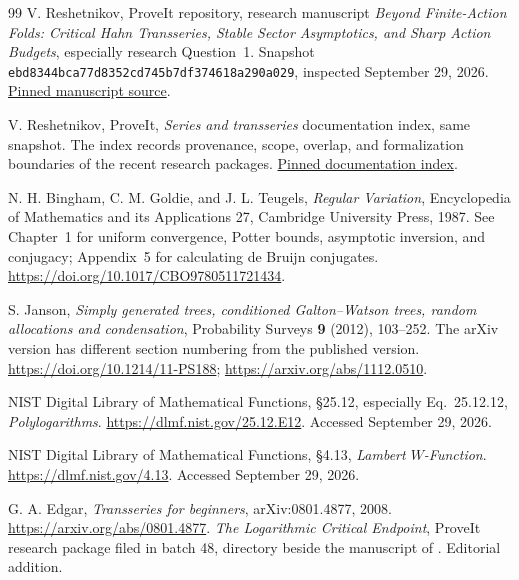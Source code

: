 \documentclass[11pt,a4paper]{article}
\numberwithin{equation}{section}
\theoremstyle{definition}\newtheorem{definition}[theorem]{Definition}
\theoremstyle{remark}\newtheorem{remark}[theorem]{Remark}
\theoremstyle{definition}
\begin{document}
\clearpage
\begin{thebibliography}{99}
V. Reshetnikov, ProveIt repository, research manuscript
\emph{Beyond Finite-Action Folds: Critical Hahn Transseries, Stable Sector
Asymptotics, and Sharp Action Budgets}, especially research Question~1.
Snapshot \texttt{ebd8344bca77d8352cd745b7df374618a290a029}, inspected
September 29, 2026.
\href{https://github.com/VladimirReshetnikov/ProveIt/blob/ebd8344bca77d8352cd745b7df374618a290a029/Analysis/Transseries/docs/series-and-transseries/Critical_Hahn_Transseries_Beyond_Finite_Action_Folds/article.tex}{Pinned manuscript source}.

V. Reshetnikov, ProveIt, \emph{Series and transseries} documentation index,
same snapshot. The index records provenance, scope, overlap, and
formalization boundaries of the recent research packages.
\href{https://github.com/VladimirReshetnikov/ProveIt/blob/ebd8344bca77d8352cd745b7df374618a290a029/Analysis/Transseries/docs/series-and-transseries/README.md}{Pinned documentation index}.

N. H. Bingham, C. M. Goldie, and J. L. Teugels,
\emph{Regular Variation}, Encyclopedia of Mathematics and its
Applications 27, Cambridge University Press, 1987.
See Chapter~1 for uniform convergence, Potter bounds, asymptotic inversion,
and conjugacy; Appendix~5 for calculating de Bruijn conjugates.
\url{https://doi.org/10.1017/CBO9780511721434}.

S. Janson, \emph{Simply generated trees, conditioned Galton--Watson trees,
random allocations and condensation}, Probability Surveys \textbf{9}
(2012), 103--252. The arXiv version has different section numbering from
the published version.
\url{https://doi.org/10.1214/11-PS188};
\url{https://arxiv.org/abs/1112.0510}.

NIST Digital Library of Mathematical Functions,
\S25.12, especially Eq.~25.12.12, \emph{Polylogarithms}.
\url{https://dlmf.nist.gov/25.12.E12}.
Accessed September 29, 2026.

NIST Digital Library of Mathematical Functions,
\S4.13, \emph{Lambert $W$-Function}.
\url{https://dlmf.nist.gov/4.13}.
Accessed September 29, 2026.

G. A. Edgar, \emph{Transseries for beginners},
arXiv:0801.4877, 2008.
\url{https://arxiv.org/abs/0801.4877}.
\emph{The Logarithmic Critical Endpoint}, ProveIt research package filed in
batch 48, directory 
beside the manuscript of \cite{repo-critical}. Editorial addition.


\end{thebibliography}
\end{document}
